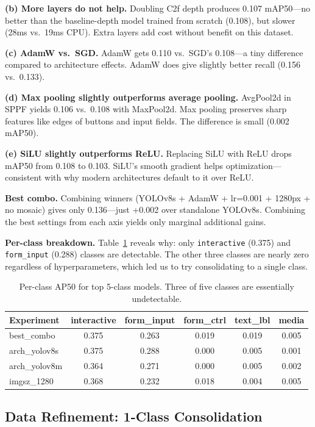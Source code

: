 \documentclass{article}
\begin{document}
\textbf{(b) More layers do not help.} Doubling C2f depth produces 0.107 mAP50---no better than the baseline-depth model trained from scratch (0.108), but slower (28ms vs.\ 19ms CPU). Extra layers add cost without benefit on this dataset.

\textbf{(c) AdamW vs.\ SGD.} AdamW gets 0.110 vs.\ SGD's 0.108---a tiny difference compared to architecture effects. AdamW does give slightly better recall (0.156 vs.\ 0.133).

\textbf{(d) Max pooling slightly outperforms average pooling.} AvgPool2d in SPPF yields 0.106 vs.\ 0.108 with MaxPool2d. Max pooling preserves sharp features like edges of buttons and input fields. The difference is small (0.002 mAP50).

\textbf{(e) SiLU slightly outperforms ReLU.} Replacing SiLU with ReLU drops mAP50 from 0.108 to 0.103. SiLU's smooth gradient helps optimization---consistent with why modern architectures default to it over ReLU.

\textbf{Best combo.} Combining winners (YOLOv8s + AdamW + lr=0.001 + 1280px + no mosaic) gives only 0.136---just +0.002 over standalone YOLOv8s. Combining the best settings from each axis yields only marginal additional gains.

\textbf{Per-class breakdown.} Table~\ref{tab:yolo_perclass} reveals why: only \texttt{interactive} (0.375) and \texttt{form\_input} (0.288) classes are detectable. The other three classes are nearly zero regardless of hyperparameters, which led us to try consolidating to a single class.

\begin{table}[t]
\centering
\caption{Per-class AP50 for top 5-class models. Three of five classes are essentially undetectable.}
\label{tab:yolo_perclass}
\small
\begin{tabular}{lccccc}
\toprule
Experiment & interactive & form\_input & form\_ctrl & text\_lbl & media \\
\midrule
best\_combo & 0.375 & 0.263 & 0.019 & 0.019 & 0.005 \\
arch\_yolov8s & 0.375 & 0.288 & 0.000 & 0.005 & 0.001 \\
arch\_yolov8m & 0.364 & 0.271 & 0.000 & 0.005 & 0.002 \\
imgsz\_1280 & 0.368 & 0.232 & 0.018 & 0.004 & 0.005 \\
\bottomrule
\end{tabular}
\end{table}

\subsection{Data Refinement: 1-Class Consolidation}
\label{sec:1cls}
\end{document}
